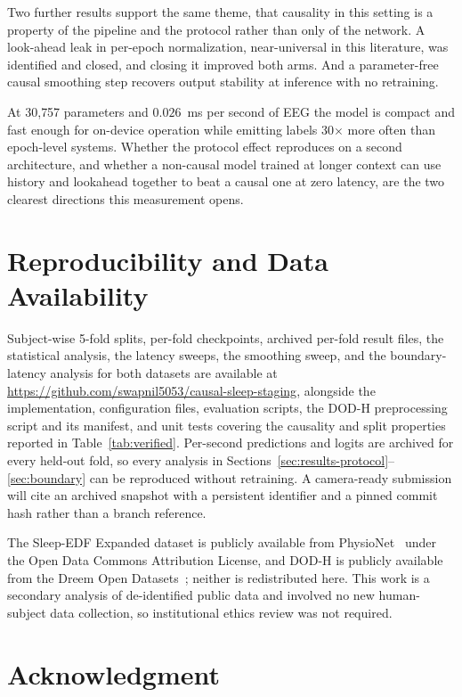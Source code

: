 \documentclass[conference]{IEEEtran}
\begin{document}
Two further results support the same theme, that causality in this setting is a property of the
pipeline and the protocol rather than only of the network. A look-ahead leak in per-epoch
normalization, near-universal in this literature, was identified and closed, and closing it improved
both arms. And a parameter-free causal smoothing step recovers output stability at inference with no
retraining.

At 30{,}757 parameters and $0.026$~ms per second of EEG the model is compact and fast enough for
on-device operation while emitting labels 30$\times$ more often than epoch-level systems. Whether the
protocol effect reproduces on a second architecture, and whether a non-causal model trained at longer
context can use history and lookahead together to beat a causal one at zero latency, are the two
clearest directions this measurement opens.

\section*{Reproducibility and Data Availability}
\sloppy

Subject-wise 5-fold splits, per-fold checkpoints, archived per-fold result files, the statistical
analysis, the latency sweeps, the smoothing sweep, and the boundary-latency analysis for both
datasets are available at \url{https://github.com/swapnil5053/causal-sleep-staging}, alongside the
implementation, configuration files, evaluation scripts, the DOD-H preprocessing script and its
manifest, and unit tests covering the causality and split properties reported in
Table~\ref{tab:verified}. Per-second predictions and logits are archived for every held-out fold, so
every analysis in Sections~\ref{sec:results-protocol}--\ref{sec:boundary} can be reproduced without
retraining. A camera-ready submission will cite an archived snapshot with a persistent identifier and
a pinned commit hash rather than a branch reference.

The Sleep-EDF Expanded dataset is publicly available from PhysioNet~\cite{physionet,kemp} under the
Open Data Commons Attribution License, and DOD-H is publicly available from the Dreem Open
Datasets~\cite{dod}; neither is redistributed here. This work is a secondary analysis of
de-identified public data and involved no new human-subject data collection, so institutional ethics
review was not required.

\section*{Acknowledgment}
\end{document}
